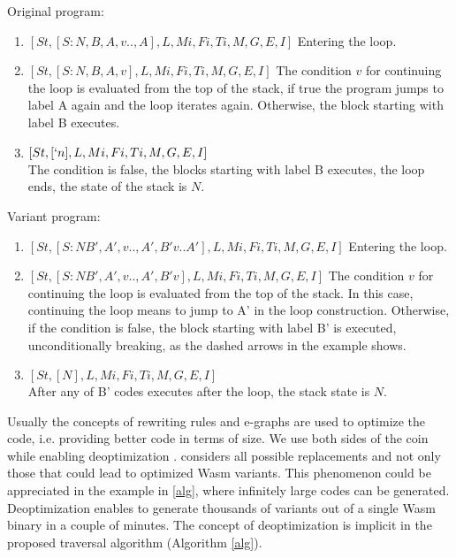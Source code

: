 Original program:
\begin{enumerate}
    \item $[St, [S: N,B,A, v.., A], L, Mi, Fi, Ti, M, G, E, I]$ Entering the loop.
    \item $[St, [S: N,B,A, v], L, Mi, Fi, Ti, M, G, E, I]$ The condition $v$ for continuing the loop is evaluated from the top of the stack, if true the program jumps to label A again and the loop iterates again. Otherwise, the block starting with label B executes.
    \item $[St, [`n], L, Mi, Fi, Ti, M, G, E, I]$\\
    The condition is false, the blocks starting with label B executes, the loop ends, the state of the stack is $N$.
\end{enumerate}

Variant program:

\begin{enumerate}
    \item $[St, [S: N B',A', v.., A', B'v..A'], L, Mi, Fi, Ti, M, G, E, I]$ Entering the loop.
    \item $[St, [S: N B',A', v.., A', B'v], L, Mi, Fi, Ti, M, G, E, I]$ The condition $v$ for continuing the loop is evaluated from the top of the stack. In this case, continuing the loop means to jump to A' in the loop construction. Otherwise, if the condition is false, the block starting with label B' is executed, unconditionally breaking, as the dashed arrows in the example shows.
    \item $[St, [N], L, Mi, Fi, Ti, M, G, E, I]$\\
    After any of B' codes executes after the loop, the stack state is $N$.
\end{enumerate}



Usually the concepts of rewriting rules and e-graphs are used to optimize the code, i.e. providing better code in terms of size.
We use both sides of the coin while enabling deoptimization \cite{deoptimization}. 
\tool considers all possible replacements and not only those that could lead to optimized Wasm variants.
This phenomenon could be appreciated in the example in \autoref{alg}, where infinitely large codes can be generated.
Deoptimization enables \tool to generate thousands of variants out of a single Wasm binary in a couple of minutes.
The concept of deoptimization is implicit in the proposed traversal algorithm (Algorithm \ref{alg}).

